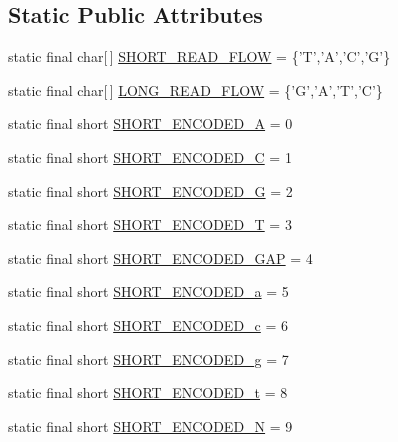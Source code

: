 \subsection*{Static Public Attributes}
\begin{DoxyCompactItemize}
\item 
static final char\mbox{[}$\,$\mbox{]} \hyperlink{classbroad_1_1core_1_1sequence_1_1_sequence_a753cb91384665e3a3440ce2f1844fa4a}{S\+H\+O\+R\+T\+\_\+\+R\+E\+A\+D\+\_\+\+F\+L\+O\+W} = \{'T','A','C','G'\}
\item 
static final char\mbox{[}$\,$\mbox{]} \hyperlink{classbroad_1_1core_1_1sequence_1_1_sequence_a22c8e2cb48a3bac92822a2ab77e006da}{L\+O\+N\+G\+\_\+\+R\+E\+A\+D\+\_\+\+F\+L\+O\+W} = \{'G','A','T','C'\}
\item 
static final short \hyperlink{classbroad_1_1core_1_1sequence_1_1_sequence_a5e9588156dd0a4c914cf8ea5e46dc288}{S\+H\+O\+R\+T\+\_\+\+E\+N\+C\+O\+D\+E\+D\+\_\+\+A} = 0
\item 
static final short \hyperlink{classbroad_1_1core_1_1sequence_1_1_sequence_a7eaf6345f01e26bfcf1925adb7b63b6a}{S\+H\+O\+R\+T\+\_\+\+E\+N\+C\+O\+D\+E\+D\+\_\+\+C} = 1
\item 
static final short \hyperlink{classbroad_1_1core_1_1sequence_1_1_sequence_a1035184882e0829351d913c8212b8e99}{S\+H\+O\+R\+T\+\_\+\+E\+N\+C\+O\+D\+E\+D\+\_\+\+G} = 2
\item 
static final short \hyperlink{classbroad_1_1core_1_1sequence_1_1_sequence_aa8830afd48b5456f422e0d4ac282c3e4}{S\+H\+O\+R\+T\+\_\+\+E\+N\+C\+O\+D\+E\+D\+\_\+\+T} = 3
\item 
static final short \hyperlink{classbroad_1_1core_1_1sequence_1_1_sequence_af6b23c272152e3450a5ed58c95b31fdb}{S\+H\+O\+R\+T\+\_\+\+E\+N\+C\+O\+D\+E\+D\+\_\+\+G\+A\+P} = 4
\item 
static final short \hyperlink{classbroad_1_1core_1_1sequence_1_1_sequence_aa8b9e6eb9635659fb61f46a91a2c1831}{S\+H\+O\+R\+T\+\_\+\+E\+N\+C\+O\+D\+E\+D\+\_\+a} = 5
\item 
static final short \hyperlink{classbroad_1_1core_1_1sequence_1_1_sequence_ade4cf8fa3c5604985c82057049949f18}{S\+H\+O\+R\+T\+\_\+\+E\+N\+C\+O\+D\+E\+D\+\_\+c} = 6
\item 
static final short \hyperlink{classbroad_1_1core_1_1sequence_1_1_sequence_a317b007c9ec5f87d5e4bae72adb17717}{S\+H\+O\+R\+T\+\_\+\+E\+N\+C\+O\+D\+E\+D\+\_\+g} = 7
\item 
static final short \hyperlink{classbroad_1_1core_1_1sequence_1_1_sequence_a1b69cede3c60348e6b8f9ab1aec01912}{S\+H\+O\+R\+T\+\_\+\+E\+N\+C\+O\+D\+E\+D\+\_\+t} = 8
\item 
static final short \hyperlink{classbroad_1_1core_1_1sequence_1_1_sequence_a421b5eb48f2848619737a1a706ff2c55}{S\+H\+O\+R\+T\+\_\+\+E\+N\+C\+O\+D\+E\+D\+\_\+\+N} = 9
\end{DoxyCompactItemize}


